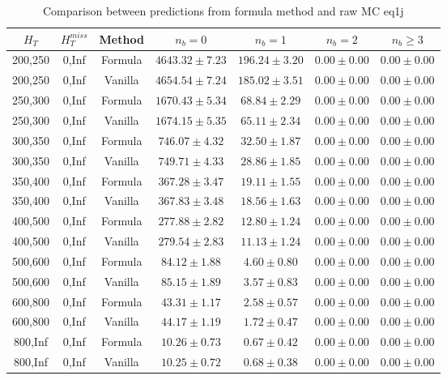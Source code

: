 
\begin{longtable}{ | c | c | c | c | c | c | c | }
\caption{Comparison between predictions from formula method and raw MC eq1j} \label{tab:formula-eq1j} \\    \hline 
$H_{T}$ & $H_{T}^{miss}$ & Method & $n_{b} = 0$ & $n_{b} = 1$ & $n_{b} = 2$ & $n_{b} \ge 3$ \\ \hline200,250 & 0,Inf & Formula  & $  4643.32 \pm  7.23 $ & $   196.24 \pm  3.20 $ & $     0.00 \pm  0.00 $ & $     0.00 \pm  0.00 $  \\  
200,250 & 0,Inf & Vanilla  & $  4654.54 \pm  7.24 $ & $   185.02 \pm  3.51 $ & $     0.00 \pm  0.00 $ & $     0.00 \pm  0.00 $  \\ \hline 
250,300 & 0,Inf & Formula  & $  1670.43 \pm  5.34 $ & $    68.84 \pm  2.29 $ & $     0.00 \pm  0.00 $ & $     0.00 \pm  0.00 $  \\  
250,300 & 0,Inf & Vanilla  & $  1674.15 \pm  5.35 $ & $    65.11 \pm  2.34 $ & $     0.00 \pm  0.00 $ & $     0.00 \pm  0.00 $  \\ \hline 
300,350 & 0,Inf & Formula  & $   746.07 \pm  4.32 $ & $    32.50 \pm  1.87 $ & $     0.00 \pm  0.00 $ & $     0.00 \pm  0.00 $  \\  
300,350 & 0,Inf & Vanilla  & $   749.71 \pm  4.33 $ & $    28.86 \pm  1.85 $ & $     0.00 \pm  0.00 $ & $     0.00 \pm  0.00 $  \\ \hline 
350,400 & 0,Inf & Formula  & $   367.28 \pm  3.47 $ & $    19.11 \pm  1.55 $ & $     0.00 \pm  0.00 $ & $     0.00 \pm  0.00 $  \\  
350,400 & 0,Inf & Vanilla  & $   367.83 \pm  3.48 $ & $    18.56 \pm  1.63 $ & $     0.00 \pm  0.00 $ & $     0.00 \pm  0.00 $  \\ \hline 
400,500 & 0,Inf & Formula  & $   277.88 \pm  2.82 $ & $    12.80 \pm  1.24 $ & $     0.00 \pm  0.00 $ & $     0.00 \pm  0.00 $  \\  
400,500 & 0,Inf & Vanilla  & $   279.54 \pm  2.83 $ & $    11.13 \pm  1.24 $ & $     0.00 \pm  0.00 $ & $     0.00 \pm  0.00 $  \\ \hline 
500,600 & 0,Inf & Formula  & $    84.12 \pm  1.88 $ & $     4.60 \pm  0.80 $ & $     0.00 \pm  0.00 $ & $     0.00 \pm  0.00 $  \\  
500,600 & 0,Inf & Vanilla  & $    85.15 \pm  1.89 $ & $     3.57 \pm  0.83 $ & $     0.00 \pm  0.00 $ & $     0.00 \pm  0.00 $  \\ \hline 
600,800 & 0,Inf & Formula  & $    43.31 \pm  1.17 $ & $     2.58 \pm  0.57 $ & $     0.00 \pm  0.00 $ & $     0.00 \pm  0.00 $  \\  
600,800 & 0,Inf & Vanilla  & $    44.17 \pm  1.19 $ & $     1.72 \pm  0.47 $ & $     0.00 \pm  0.00 $ & $     0.00 \pm  0.00 $  \\ \hline 
800,Inf & 0,Inf & Formula  & $    10.26 \pm  0.73 $ & $     0.67 \pm  0.42 $ & $     0.00 \pm  0.00 $ & $     0.00 \pm  0.00 $  \\  
800,Inf & 0,Inf & Vanilla  & $    10.25 \pm  0.72 $ & $     0.68 \pm  0.38 $ & $     0.00 \pm  0.00 $ & $     0.00 \pm  0.00 $  \\ \hline 
    \hline 
    \hline 
\end{longtable}